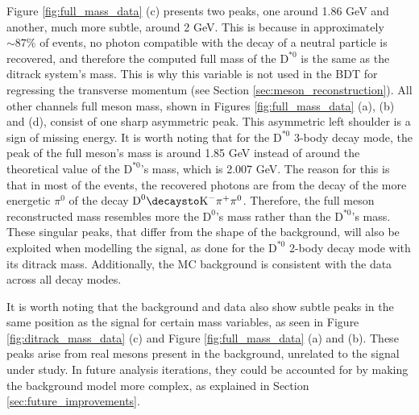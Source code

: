 Figure \ref{fig:full_mass_data} (c) presents two peaks, one around 1.86 GeV and another, much more subtle, around 2 GeV. This is because in approximately $\sim 87\%$ of events, no photon compatible with the decay of a neutral particle is recovered, and therefore the computed full mass of the $\text{D}^{*0}$ is the same as the ditrack system's mass. This is why this variable is not used in the BDT for regressing the transverse momentum (see Section \ref{sec:meson_reconstruction}). All other channels full meson mass, shown in Figures \ref{fig:full_mass_data} (a), (b) and (d), consist of one sharp asymmetric peak. This asymmetric left shoulder is a sign of missing energy. It is worth noting that for the $\text{D}^{*0}$ 3-body decay mode, the peak of the full meson's mass is around 1.85 GeV instead of around the theoretical value of the $\text{D}^{*0}$'s mass, which is 2.007 GeV. The reason for this is that in most of the events, the recovered photons are from the decay of the more energetic $\pi^0$ of the decay $\text{D}^{0}\decaysto \text{K}^{-}\pi^{+}\pi^0$. Therefore, the full meson reconstructed mass resembles more the $\text{D}^{0}$'s mass rather than the $\text{D}^{*0}$'s mass. These singular peaks, that differ from the shape of the background, will also be exploited when modelling the signal, as done for the $\text{D}^{*0}$ 2-body decay mode with its ditrack mass. Additionally, the MC background is consistent with the data across all decay modes.

It is worth noting that the background and data also show subtle peaks in the same position as the signal for certain mass variables, as seen in Figure \ref{fig:ditrack_mass_data} (c) and Figure \ref{fig:full_mass_data} (a) and (b). These peaks arise from real mesons present in the background, unrelated to the signal under study. In future analysis iterations, they could be accounted for by making the background model more complex, as explained in Section \ref{sec:future_improvements}.

\newpage

